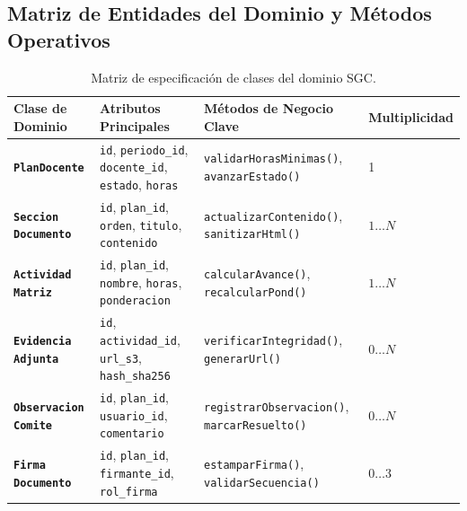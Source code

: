 \documentclass[12pt,a4paper]{article}
\begin{document}
\subsection{Matriz de Entidades del Dominio y Métodos Operativos}
\begin{table}[H]
\centering
\small
\renewcommand{\arraystretch}{1.2}
\begin{tabularx}{\textwidth}{|>{\hsize=1.0\hsize\raggedright\arraybackslash\bfseries\footnotesize}X|>{\hsize=1.2\hsize\raggedright\arraybackslash\footnotesize}X|>{\hsize=1.2\hsize\raggedright\arraybackslash\footnotesize}X|>{\hsize=0.6\hsize\centering\arraybackslash\footnotesize}X|}
\hline
\rowcolor{tableheader}
\textbf{Clase de Dominio} & \textbf{Atributos Principales} & \textbf{Métodos de Negocio Clave} & \textbf{Multiplicidad} \\
\hline
\texttt{PlanDocente} & \texttt{id}, \texttt{periodo\_\allowbreak  id}, \texttt{docente\_\allowbreak  id}, \texttt{estado}, \texttt{horas} & \texttt{validarHorasMinimas()}, \texttt{avanzarEstado()} & 1 \\
\hline
\texttt{Seccion Documento} & \texttt{id}, \texttt{plan\_\allowbreak  id}, \texttt{orden}, \texttt{titulo}, \texttt{contenido} & \texttt{actualizarContenido()}, \texttt{sanitizarHtml()} & $1 \dots N$ \\
\hline
\texttt{Actividad Matriz} & \texttt{id}, \texttt{plan\_\allowbreak  id}, \texttt{nombre}, \texttt{horas}, \texttt{ponderacion} & \texttt{calcularAvance()}, \texttt{recalcularPond()} & $1 \dots N$ \\
\hline
\texttt{Evidencia Adjunta} & \texttt{id}, \texttt{actividad\_\allowbreak  id}, \texttt{url\_\allowbreak  s3}, \texttt{hash\_\allowbreak  sha256} & \texttt{verificarIntegridad()}, \texttt{generarUrl()} & $0 \dots N$ \\
\hline
\texttt{Observacion Comite} & \texttt{id}, \texttt{plan\_\allowbreak  id}, \texttt{usuario\_\allowbreak  id}, \texttt{comentario} & \texttt{registrarObservacion()}, \texttt{marcarResuelto()} & $0 \dots N$ \\
\hline
\texttt{Firma Documento} & \texttt{id}, \texttt{plan\_\allowbreak  id}, \texttt{firmante\_\allowbreak  id}, \texttt{rol\_\allowbreak  firma} & \texttt{estamparFirma()}, \texttt{validarSecuencia()} & $0 \dots 3$ \\
\hline
\end{tabularx}
\caption{Matriz de especificación de clases del dominio SGC.}
\label{tab:espec_clases}
\end{table}
\end{document}

